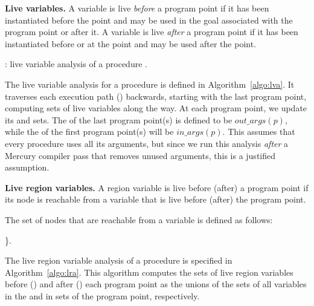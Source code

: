 \documentclass{tlp}
\newcommand{\inargs}[1]{\ensuremath{\mathit{in\_args}(#1)}}
\newcommand{\outargs}[1]{\ensuremath{\mathit{out\_args}(#1)}}
\begin{document}
\noindent\textbf{Live variables.}
A variable is live \emph{before} a program point
if it has been instantiated before the point
and may be used in the goal associated with the program point or after it.
A variable is live \emph{after} a program point
if it has been instantiated before or at the point
and may be used after the point.

\begin{algorithm}
    \small
    \caption{: live variable analysis of a procedure .}
    \label{algo:lva}
\begin{algorithmic}

        \STATE 
    \ENDFOR
            \STATE 
            \IF{}
                \STATE 
            \ELSE
                \STATE 
            \ENDIF
            \IF{}
                \STATE 
            \ELSE
                \STATE 
            \ENDIF
        \ENDFOR
    \ENDFOR

\end{algorithmic}
\normalsize
\end{algorithm}

The live variable analysis for a procedure 
is defined in Algorithm~\ref{algo:lva}.
It traverses each execution path () backwards,
starting with the last program point,
computing sets of live variables along the way.
At each program point, we update its  and  sets.
The  of the last program point(s) is defined to be \outargs{p},
while the  of the first program point(s) will be \inargs{p}.
This assumes that every procedure uses all its arguments,
but since we run this analysis \emph{after} a Mercury compiler pass
that removes unused arguments, this is a justified assumption.

\noindent\textbf{Live region variables.}
A region variable is live before (after) a program point
if its node is reachable from a variable that is live before (after) the
program point.

The set of nodes that are reachable from a variable  is defined as follows:
\begin{center}
    \small
    \}.
    \normalsize
\end{center}

The live region variable analysis of a procedure
is specified in Algorithm~\ref{algo:lra}.
This algorithm computes the sets of live region variables
before () and after () each program point
as the unions of the  sets of all variables
in the  and in  sets of the program point, respectively.
\end{document}

